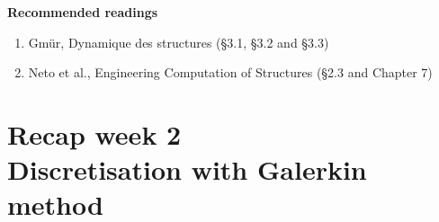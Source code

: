 \documentclass[aspectratio=169]{beamer}
\begin{document}
{\begin{frame}
    \textbf{\large Recommended readings}
    \begin{enumerate}
      \item Gmür, Dynamique des structures (§3.1, §3.2 and §3.3)
      \item Neto et al., Engineering Computation of Structures (§2.3 and Chapter 7)
    \end{enumerate}
  \end{frame}


  \section{Recap week 2 \\ Discretisation with Galerkin method}
   {

}}
\end{document}
